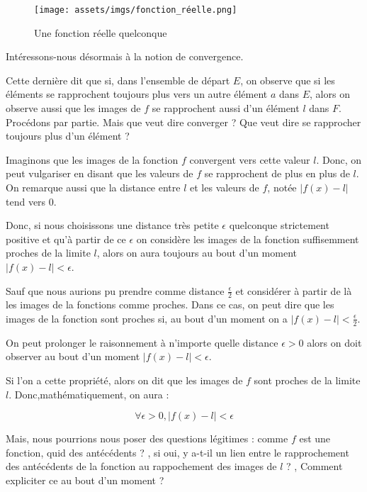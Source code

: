 \begin{figure}[H]
\centering \texttt{[image: assets/imgs/fonction\_réelle.png]}
\caption{Une fonction réelle quelconque}
\label{fig:fonction_réelle}
\end{figure}



Intéressons-nous désormais à la notion de convergence.

Cette dernière dit que si, dans l'ensemble de départ $E$, on observe que si les éléments se rapprochent toujours plus vers un autre élément $a$ dans $E$, alors on observe aussi que les images de $f$ se rapprochent aussi d'un élément $l$ dans $F$. Procédons par partie. Mais que veut dire converger ? Que veut dire se rapprocher toujours plus d'un élément ?


Imaginons que les images de la fonction $f$ convergent vers cette valeur $l$. Donc, on peut vulgariser en disant que les valeurs de $f$ se rapprochent de plus en plus de $l$. On remarque aussi que la distance entre $l$ et les valeurs de $f$, notée $\lvert f(x) - l \rvert$ tend vers $0$.


Donc, si nous choisissons une distance très petite $\epsilon$ quelconque strictement positive et qu'à partir de ce $\epsilon$ on considère les images de la fonction suffisemment proches de la limite $l$, alors on aura toujours au bout d'un moment $\lvert f(x) - l \rvert < \epsilon$.


Sauf que nous aurions pu prendre comme distance $\frac{\epsilon}{2}$ et considérer à partir de là les images de la fonctions comme proches. Dans ce cas, on peut dire que les images de la fonction sont proches si, au bout d'un moment on a $\lvert f(x) - l \rvert <\frac{\epsilon}{2}$. 


On peut prolonger le raisonnement à n'importe quelle distance $\epsilon>0$ alors on doit observer au bout d'un moment $\lvert f(x) - l \rvert < \epsilon$. 


Si l'on a cette propriété, alors on dit que les images de $f$ sont proches de la limite $l$. Donc,mathématiquement, on aura :

$$\forall \epsilon > 0, \lvert f(x) - l\rvert < \epsilon$$


Mais, nous pourrions nous poser des questions légitimes : \og comme $f$ est une fonction, quid des antécédents ? \fg , \og si oui, y a-t-il un lien entre le rapprochement des antécédents de la fonction au rappochement des images de $l$ ? \fg , \og Comment expliciter ce \og au bout d'un moment \fg ? \fg

